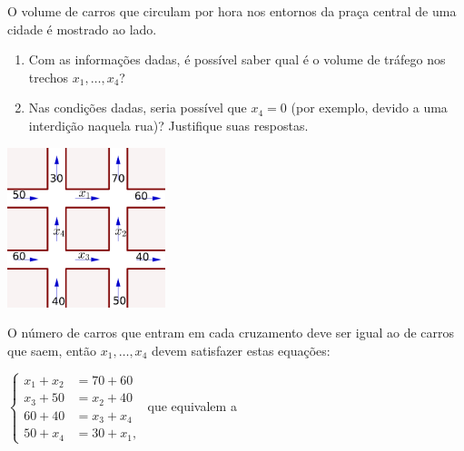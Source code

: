 \documentclass[12pt,a4paper]{article}
\begin{document}
\begin{ExerciseList}
\Exercise[title={2,5}]
\begin{minipage}[t]{0.6\textwidth}
O volume de carros que circulam por hora nos entornos da praça central de uma cidade é mostrado ao lado.
\begin{enumerate}
\item Com as informações dadas, é possível saber qual é o volume de tráfego nos trechos $x_1, \ldots, x_4$?
\item Nas condições dadas, seria possível que $x_4 = 0$ (por exemplo, devido a uma interdição naquela rua)? Justifique suas respostas.
\end{enumerate}
\end{minipage}
\hfill
\begin{minipage}[t]{0.3\textwidth}
\raggedleft
\vfill
\includegraphics[width=4.6cm]{img/prova-1-pro-quadras}
\end{minipage}
\Answer O número de carros que entram em cada cruzamento deve ser igual ao de carros que saem, então $x_1, \ldots, x_4$ devem satisfazer estas equações:

$\begin{cases}
x_1 + x_2 & = 70 + 60\\
x_3 +  50 & = x_2 + 40\\
60 + 40   & = x_3 + x_4\\
50 + x_4    & = 30 + x_1,
\end{cases}$
que equivalem a


\end{ExerciseList}
\end{document}
